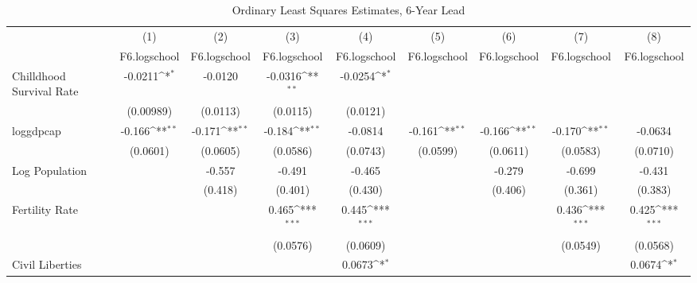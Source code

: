 \begin{table}[htbp]\centering
\def\sym#1{\ifmmode^{#1}\else\(^{#1}\)\fi}
\caption{Ordinary Least Squares Estimates, 6-Year Lead}
\begin{tabular}{l*{8}{c}}
\toprule
                &\multicolumn{1}{c}{(1)}&\multicolumn{1}{c}{(2)}&\multicolumn{1}{c}{(3)}&\multicolumn{1}{c}{(4)}&\multicolumn{1}{c}{(5)}&\multicolumn{1}{c}{(6)}&\multicolumn{1}{c}{(7)}&\multicolumn{1}{c}{(8)}\\
                &\multicolumn{1}{c}{F6.logschool}&\multicolumn{1}{c}{F6.logschool}&\multicolumn{1}{c}{F6.logschool}&\multicolumn{1}{c}{F6.logschool}&\multicolumn{1}{c}{F6.logschool}&\multicolumn{1}{c}{F6.logschool}&\multicolumn{1}{c}{F6.logschool}&\multicolumn{1}{c}{F6.logschool}\\
\midrule
Chilldhood Survival Rate&  -0.0211\sym{*}  &  -0.0120         &  -0.0316\sym{**} &  -0.0254\sym{*}  &                  &                  &                  &                  \\
                &(0.00989)         & (0.0113)         & (0.0115)         & (0.0121)         &                  &                  &                  &                  \\
\addlinespace
loggdpcap       &   -0.166\sym{**} &   -0.171\sym{**} &   -0.184\sym{**} &  -0.0814         &   -0.161\sym{**} &   -0.166\sym{**} &   -0.170\sym{**} &  -0.0634         \\
                & (0.0601)         & (0.0605)         & (0.0586)         & (0.0743)         & (0.0599)         & (0.0611)         & (0.0583)         & (0.0710)         \\
\addlinespace
Log Population  &                  &   -0.557         &   -0.491         &   -0.465         &                  &   -0.279         &   -0.699         &   -0.431         \\
                &                  &  (0.418)         &  (0.401)         &  (0.430)         &                  &  (0.406)         &  (0.361)         &  (0.383)         \\
\addlinespace
Fertility Rate  &                  &                  &    0.465\sym{***}&    0.445\sym{***}&                  &                  &    0.436\sym{***}&    0.425\sym{***}\\
                &                  &                  & (0.0576)         & (0.0609)         &                  &                  & (0.0549)         & (0.0568)         \\
\addlinespace
Civil Liberties &                  &                  &                  &   0.0673\sym{*}  &                  &                  &                  &   0.0674\sym{*}  \\

\end{tabular}
\end{table}
